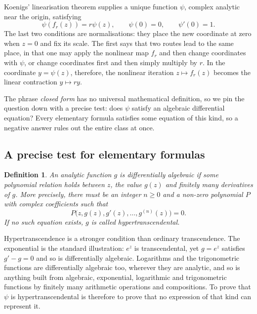 \documentclass[11pt]{article}
\newtheorem{definition}{Definition}
\begin{document}
Koenigs' linearisation theorem \cite{Koenigs1884,Milnor2006} supplies a unique function $\psi$, complex analytic near the origin, satisfying
\begin{equation}\label{eq:koenigs}
 \psi(f_r(z))=r\psi(z),
 \qquad
 \psi(0)=0,
 \qquad
 \psi'(0)=1.
\end{equation}
The last two conditions are normalisations: they place the new coordinate at zero when $z=0$ and fix its scale. The first says that two routes lead to the same place, in that one may apply the nonlinear map $f_r$ and then change coordinates with $\psi$, or change coordinates first and then simply multiply by $r$. In the coordinate $y=\psi(z)$, therefore, the nonlinear iteration $z\mapsto f_r(z)$ becomes the linear contraction $y\mapsto ry$.

The phrase \emph{closed form} has no universal mathematical definition, so we pin the question down with a precise test: does $\psi$ satisfy an algebraic differential equation? Every elementary formula satisfies some equation of this kind, so a negative answer rules out the entire class at once.

\subsection{A precise test for elementary formulas}

\begin{definition}
An analytic function $g$ is \emph{differentially algebraic} if some polynomial relation holds between $z$, the value $g(z)$ and finitely many derivatives of $g$. More precisely, there must be an integer $n\geq 0$ and a non-zero polynomial $P$ with complex coefficients such that
\begin{equation}\label{eq:ade}
 P\bigl(z,g(z),g'(z),\ldots,g^{(n)}(z)\bigr)=0.
\end{equation}
If no such equation exists, $g$ is called \emph{hypertranscendental}.
\end{definition}

Hypertranscendence is a stronger condition than ordinary transcendence. The exponential is the standard illustration: $e^z$ is transcendental, yet $g=e^z$ satisfies $g'-g=0$ and so is differentially algebraic. Logarithms and the trigonometric functions are differentially algebraic too, wherever they are analytic, and so is anything built from algebraic, exponential, logarithmic and trigonometric functions by finitely many arithmetic operations and compositions. To prove that $\psi$ is hypertranscendental is therefore to prove that no expression of that kind can represent it.
\end{document}
